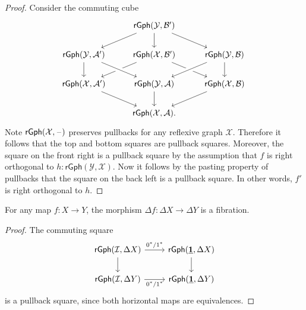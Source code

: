 \begin{proof}
Consider the commuting cube
\begin{equation*}
\begin{tikzcd}
& \mathsf{rGph}(\mathcal{Y},\mathcal{B}') \arrow[dl] \arrow[d] \arrow[dr] \\
\mathsf{rGph}(\mathcal{Y},\mathcal{A}') \arrow[d] & \mathsf{rGph}(\mathcal{X},\mathcal{B}') \arrow[dl] \arrow[dr] & \mathsf{rGph}(\mathcal{Y},\mathcal{B}) \arrow[dl,crossing over] \arrow[d] \\
\mathsf{rGph}(\mathcal{X},\mathcal{A}') \arrow[dr] & \mathsf{rGph}(\mathcal{Y},\mathcal{A}) \arrow[from=ul,crossing over] \arrow[d] & \mathsf{rGph}(\mathcal{X},\mathcal{B}) \arrow[dl] \\
& \mathsf{rGph}(\mathcal{X},\mathcal{A}). & \phantom{\mathsf{rGph}(\mathcal{X},\mathcal{A}')}
\end{tikzcd}
\end{equation*}
Note $\mathsf{rGph}(\mathcal{X},\mathord{\hspace{1pt}\text{--}\hspace{1pt}})$ preserves pullbacks for any reflexive graph $\mathcal{X}$. Therefore it follows that the top and bottom squares are pullback squares. Moreover, the square on the front right is a pullback square by the assumption that $f$ is right orthogonal to $h:\mathsf{rGph}(\mathcal{Y},\mathcal{X})$. Now it follows by the pasting property of pullbacks that the square on the back left is a pullback square. In other words, $f'$ is right orthogonal to $h$. 
\end{proof}

\begin{prp}\label{prp:fibration_discrete}
For any map $f:X\to Y$, the morphism $\Delta f : \Delta X \to \Delta Y$ is a fibration.
\end{prp}

\begin{proof}
The commuting square
\begin{equation*}
\begin{tikzcd}
\mathsf{rGph}(\mathcal{I},\Delta X) \arrow[d] \arrow[r,"0^\ast/1^\ast"] & \mathsf{rGph}(\unit,\Delta X) \arrow[d] \\
\mathsf{rGph}(\mathcal{I},\Delta Y) \arrow[r,swap,"0^\ast/1^\ast"] & \mathsf{rGph}(\unit,\Delta Y)
\end{tikzcd}
\end{equation*}
is a pullback square, since both horizontal maps are equivalences.
\end{proof}

